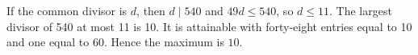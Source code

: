 If the common divisor is $d$, then $d\mid540$ and $49d\le540$, so $d\le11$. The largest divisor of 540 at most 11 is 10. It is attainable with forty-eight entries equal to 10 and one equal to 60. Hence the maximum is $\boxed{10}$.
